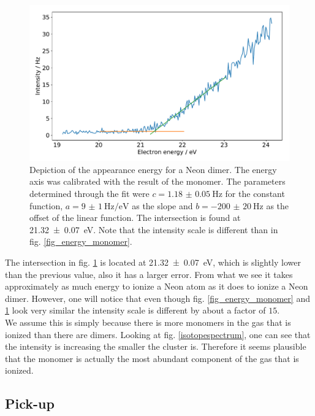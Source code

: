 \documentclass[a4paper,10pt]{article}
\begin{document}
\begin{figure}[H]
	\centering
	\includegraphics[width = 0.8 \textwidth]{energy_ne2.pdf}
	\caption{Depiction of the appearance energy for a Neon dimer. The energy axis was calibrated with the result of the monomer. The parameters determined through the fit were $c = \SI{1.18(5)}{\hertz}$ for the constant function, $a = \SI{9(1)}{\hertz \per \electronvolt}$ as the slope and $b = \SI{-200(20)}{\hertz}$ as the offset of the linear function. The intersection is found at \SI{21.32(7)}{\electronvolt}. Note that the intensity scale is different than in fig. \ref{fig_energy_monomer}. }
	\label{fig_energy_dimer}
\end{figure}
The intersection in fig. \ref{fig_energy_dimer} is located at \SI{21.32(7)}{\electronvolt}, which is slightly lower than the previous value, also it has a larger error. From what we see it takes approximately as much energy to ionize a Neon atom as it does to ionize a Neon dimer. However, one will notice that even though fig. \ref{fig_energy_monomer} and \ref{fig_energy_dimer} look very similar the intensity scale is different by about a factor of $15$. \\
We assume this is simply because there is more monomers in the gas that is ionized than there are dimers. Looking at fig. \ref{isotopespectrum}, one can see that the intensity is increasing the smaller the cluster is. Therefore it seems plausible that the monomer is actually the most abundant component of the gas that is ionized.

\subsection{Pick-up}
\end{document}
